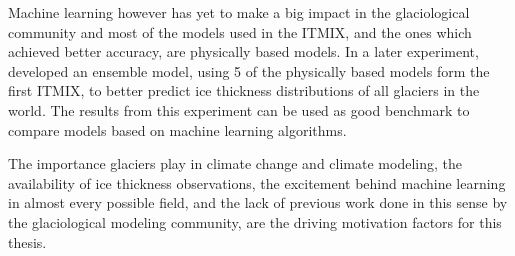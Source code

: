 Machine learning however has yet to make a big impact in the glaciological community and most of the models used in the ITMIX, and the ones which achieved better accuracy, are physically based models. In a later experiment, \citet{Farinotti2019} developed an ensemble model, using 5 of the physically based models form the first ITMIX, to better predict ice thickness distributions of all glaciers in the world. The results from this experiment can be used as good benchmark to compare models based on machine learning algorithms.

The importance glaciers play in climate change and climate modeling, the availability of ice thickness observations, the excitement behind machine learning in almost every possible field, and the lack of previous work done in this sense by the glaciological modeling community, are the driving motivation factors for this thesis.


%
%


